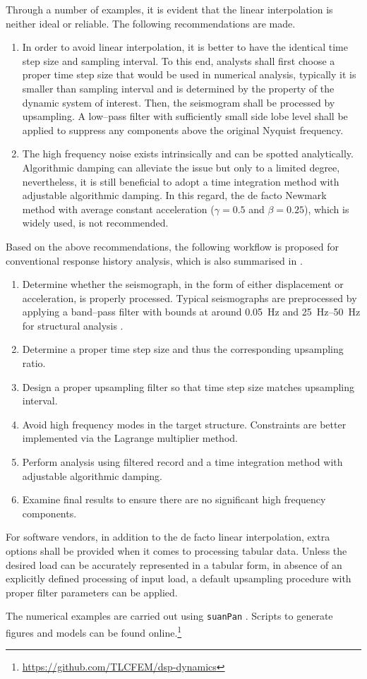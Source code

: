 Through a number of examples, it is evident that the linear interpolation is neither ideal or reliable. The following recommendations are made.
\begin{enumerate}
\item In order to avoid linear interpolation, it is better to have the identical time step size and sampling interval. To this end, analysts shall first choose a proper time step size that would be used in numerical analysis, typically it is smaller than sampling interval and is determined by the property of the dynamic system of interest. Then, the seismogram shall be processed by upsampling. A low--pass filter with sufficiently small side lobe level shall be applied to suppress any components above the original Nyquist frequency.
\item The high frequency noise exists intrinsically and can be spotted analytically. Algorithmic damping can alleviate the issue but only to a limited degree, nevertheless, it is still beneficial to adopt a time integration method with adjustable algorithmic damping. In this regard, the de facto Newmark method with average constant acceleration ($\gamma=0.5$ and $\beta=0.25$), which is widely used, is not recommended.
\end{enumerate}

Based on the above recommendations, the following workflow is proposed for conventional response history analysis, which is also summarised in .
\begin{enumerate}
\item Determine whether the seismograph, in the form of either displacement or acceleration, is properly processed. Typical seismographs are preprocessed by applying a band--pass filter with bounds at around \SI{0.05}{\hertz} and \SIrange{25}{50}{\hertz} for structural analysis \citep[see, e.g.,][]{Houtte2017}.
\item Determine a proper time step size and thus the corresponding upsampling ratio.
\item Design a proper upsampling filter so that time step size matches upsampling interval.
\item Avoid high frequency modes in the target structure. Constraints are better implemented via the Lagrange multiplier method.
\item Perform analysis using filtered record and a time integration method with adjustable algorithmic damping.
\item Examine final results to ensure there are no significant high frequency components.
\end{enumerate}

For software vendors, in addition to the de facto linear interpolation, extra options shall be provided when it comes to processing tabular data. Unless the desired load can be accurately represented in a tabular form, in absence of an explicitly defined processing of input load, a default upsampling procedure with proper filter parameters can be applied.

The numerical examples are carried out using \texttt{suanPan} \citep{Chang2022}. Scripts to generate figures and models can be found online.\footnote{\url{https://github.com/TLCFEM/dsp-dynamics}}